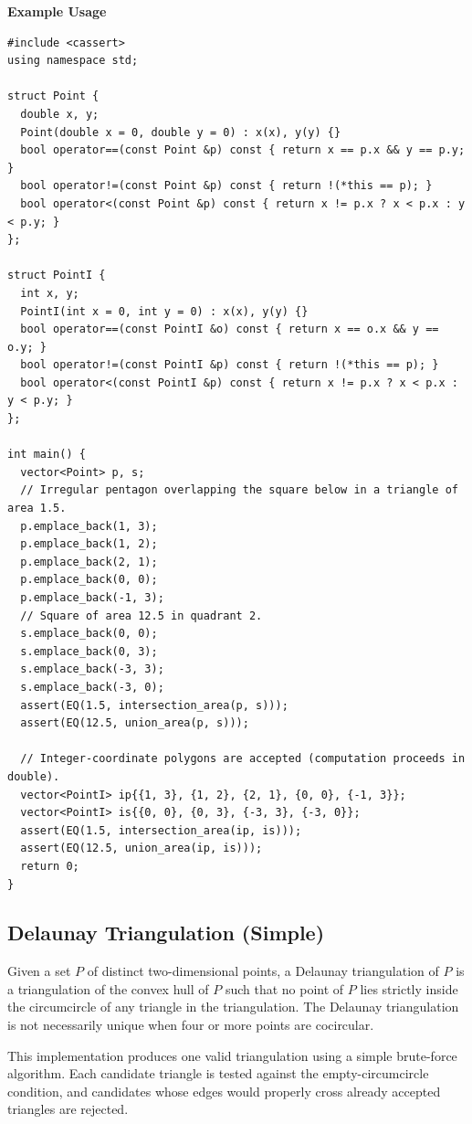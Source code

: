 \textbf{Example Usage}\par
\begin{lstlisting}[style=cpp]
#include <cassert>
using namespace std;

struct Point {
  double x, y;
  Point(double x = 0, double y = 0) : x(x), y(y) {}
  bool operator==(const Point &p) const { return x == p.x && y == p.y; }
  bool operator!=(const Point &p) const { return !(*this == p); }
  bool operator<(const Point &p) const { return x != p.x ? x < p.x : y < p.y; }
};

struct PointI {
  int x, y;
  PointI(int x = 0, int y = 0) : x(x), y(y) {}
  bool operator==(const PointI &o) const { return x == o.x && y == o.y; }
  bool operator!=(const PointI &p) const { return !(*this == p); }
  bool operator<(const PointI &p) const { return x != p.x ? x < p.x : y < p.y; }
};

int main() {
  vector<Point> p, s;
  // Irregular pentagon overlapping the square below in a triangle of area 1.5.
  p.emplace_back(1, 3);
  p.emplace_back(1, 2);
  p.emplace_back(2, 1);
  p.emplace_back(0, 0);
  p.emplace_back(-1, 3);
  // Square of area 12.5 in quadrant 2.
  s.emplace_back(0, 0);
  s.emplace_back(0, 3);
  s.emplace_back(-3, 3);
  s.emplace_back(-3, 0);
  assert(EQ(1.5, intersection_area(p, s)));
  assert(EQ(12.5, union_area(p, s)));

  // Integer-coordinate polygons are accepted (computation proceeds in double).
  vector<PointI> ip{{1, 3}, {1, 2}, {2, 1}, {0, 0}, {-1, 3}};
  vector<PointI> is{{0, 0}, {0, 3}, {-3, 3}, {-3, 0}};
  assert(EQ(1.5, intersection_area(ip, is)));
  assert(EQ(12.5, union_area(ip, is)));
  return 0;
}
\end{lstlisting}
\subsection{Delaunay Triangulation (Simple)}
\label{sec:7.4.5}
Given a set $P$ of distinct two-dimensional points, a Delaunay triangulation of $P$ is a triangulation of the convex hull of $P$ such that no point of $P$ lies strictly inside the circumcircle of any triangle in the triangulation. The Delaunay triangulation is not necessarily unique when four or more points are cocircular.

This implementation produces one valid triangulation using a simple brute-force algorithm. Each candidate triangle is tested against the empty-circumcircle condition, and candidates whose edges would properly cross already accepted triangles are rejected.

